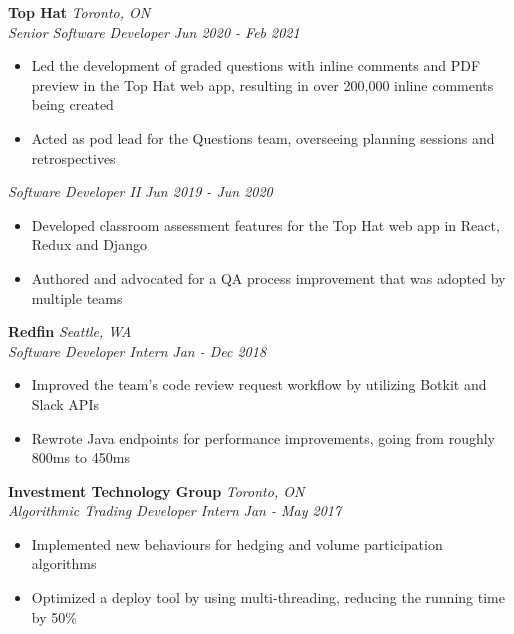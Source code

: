 \documentclass[a4paper,11pt]{article}
\begin{document}
\textbf{Top Hat} \hspace*{\fill} \emph{Toronto, ON} \\
\emph{Senior Software Developer} \hspace*{\fill} \emph{Jun 2020 - Feb 2021}
\vspace{1.5pt}
\begin{itemize}[noitemsep, topsep=-1ex]
\item Led the development of graded questions with inline comments and PDF preview in the Top Hat web app, resulting in over 200,000 inline comments being created
\item Acted as pod lead for the Questions team, overseeing planning sessions and retrospectives
\end{itemize}
\vspace{1.5pt}
\emph{Software Developer II} \hspace*{\fill} \emph{Jun 2019 - Jun 2020}
\vspace{1.5pt}
\begin{itemize}[noitemsep, topsep=-1ex]
\item Developed classroom assessment features for the Top Hat web app in React, Redux and Django
\item Authored and advocated for a QA process improvement that was adopted by multiple teams
\end{itemize}
\vspace{1.5pt}
 \textbf{Redfin} \hspace*{\fill}  \emph{Seattle, WA}  \\
\emph{Software Developer Intern} \hspace*{\fill}  \emph{Jan - Dec 2018}
\vspace{1.5pt}
\begin{itemize}[noitemsep, topsep=-1ex]
\item Improved the team's code review request workflow by utilizing Botkit and Slack APIs
\item Rewrote Java endpoints for performance improvements, going from roughly 800ms to 450ms
\end{itemize}
\vspace{1.5pt}
\textbf{Investment Technology Group} \hspace*{\fill} \emph{Toronto, ON} \\
 \emph{Algorithmic Trading Developer Intern}  \hspace*{\fill} \emph{Jan - May 2017} 
 \vspace{1.5pt}
\begin{itemize}[noitemsep, topsep=-1ex]
\item Implemented new behaviours for hedging and volume participation algorithms
\item Optimized a deploy tool by using multi-threading, reducing the running time by 50\%
\end{itemize}
  
\end{document}
